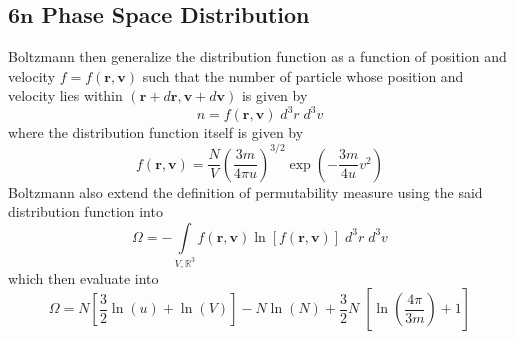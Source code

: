 \documentclass[../../../Main.tex]{subfiles}
\begin{document}
\subsection{6$\boldsymbol{n}$ Phase Space Distribution}
Boltzmann then generalize the distribution function as a function of position and velocity $f=f(\mathbf{r},\mathbf{v})$ such that the number of particle whose position and velocity lies within  $(\mathbf{r}+d\mathbf{r},\mathbf{v}+d\mathbf{v})$ is given by 
\begin{equation*}
    n=f(\mathbf{r},\mathbf{v})\;d^3r\;d^3v
\end{equation*}
where the distribution function itself is given by
\begin{equation*}
    f(\mathbf{r},\mathbf{v})=\frac{N}{V} \left(\frac{3m}{4\pi u}\right)^{3/2}\exp\left(-\frac{3m}{4u}v^2\right)
\end{equation*}
Boltzmann also extend the definition of permutability measure using the said distribution function into
\begin{equation*}
    \Omega=-\int\limits_{V,\mathbb{R}^3} f(\mathbf{r},\mathbf{v})\ln [f(\mathbf{r},\mathbf{v})]\;d^3r\;d^3v
\end{equation*} 
which then evaluate into 
\begin{equation*}
    \Omega=N\left[\frac{3}{2}\ln (u)+\ln (V)\right]-N\ln (N)+\frac{3}{2}N\;\left[\ln\left(\frac{4\pi}{3m}\right)+1\right]
\end{equation*}
\end{document}
